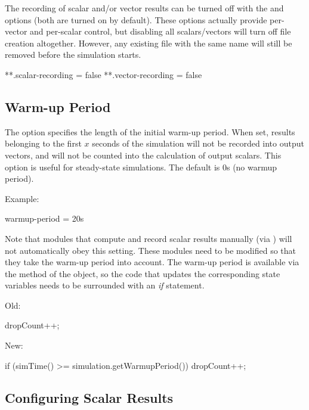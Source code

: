 The recording of scalar and/or vector results can be turned off with
the  and  options (both
are turned on by default). These options actually provide per-vector
and per-scalar control, but disabling all scalars/vectors will turn off
file creation altogether. However, any existing file with the same name
will still be removed before the simulation starts.

\begin{inifile}
**.scalar-recording = false
**.vector-recording = false
\end{inifile}


\subsection{Warm-up Period}

The  option specifies the length of the initial
warm-up period. When set, results belonging to the first $x$ seconds
of the simulation will not be recorded into output vectors, and will
not be counted into the calculation of output scalars.
This option is useful for steady-state simulations. The default is 0s
(no warmup period).

Example:

\begin{inifile}
warmup-period = 20s
\end{inifile}

Note that modules that compute and record scalar results manually
(via ) will not automatically obey this setting.
These modules need to be modified so that they take the warm-up period
into account. The warm-up period is available via the
 method of the  object,
so the code that updates the corresponding state variables needs
to be surrounded with an \textit{if} statement.

Old:

\begin{cpp}
dropCount++;
\end{cpp}

New:

\begin{cpp}
if (simTime() >= simulation.getWarmupPeriod())
    dropCount++;
\end{cpp}


\subsection{Configuring Scalar Results}


